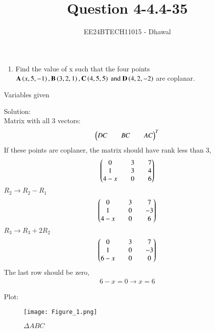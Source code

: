 \documentclass[journal]{IEEEtran}
\numberwithin{equation}{enumi}
\numberwithin{figure}{enumi}
\begin{document}

\title{Question 4-4.4-35}
\author{EE24BTECH11015 - Dhawal}
{\let\newpage\relax\maketitle}
\begin{enumerate}
\item Find the value of x such that the four points $\mathbf{A}  \left(x , 5 , -1\right), \mathbf{B} \left(3 , 2 , 1\right),\mathbf{C} 
\left(4 , 5 , 5\right) \text{ and } \mathbf{D}
\left(4 , 2 , -2\right)$ are coplanar.

\end{enumerate}

\begin{table}[h!]    
  \centering
  
  \caption{Variables given}
  \label{tab 1.4.9.2}
\end{table}
Solution:\\
Matrix with all 3 vectors: 
\begin{align}
       {\ensuremath{\begin{pmatrix}DC && BC&& AC\end{pmatrix}}}^T
\end{align}
If these points are coplaner, the matrix should have rank less than 3,
\begin{align}
	\begin{pmatrix}0&&3&&7\\1&&3&&4\\4-x&&0&&6\end{pmatrix}
\end{align}
$R_2 \rightarrow R_2-R_1$
\begin{align}
	\begin{pmatrix}0&&3&&7\\1&&0&&-3\\4-x&&0&&6\end{pmatrix}
\end{align}
$R_3 \rightarrow R_3+2R_2$
\begin{align}
	\begin{pmatrix}0&&3&&7\\1&&0&&-3\\6-x&&0&&0\end{pmatrix}
\end{align}
The last row should be zero,
\begin{align}
	6-x=0 \rightarrow x=6
\end{align}





Plot:
\begin{figure}[h!]
   \centering
   \texttt{[image: Figure\_1.png]}
	\caption{$\Delta ABC$ }
   \label{stemplot}
\end{figure}
\end{document}
